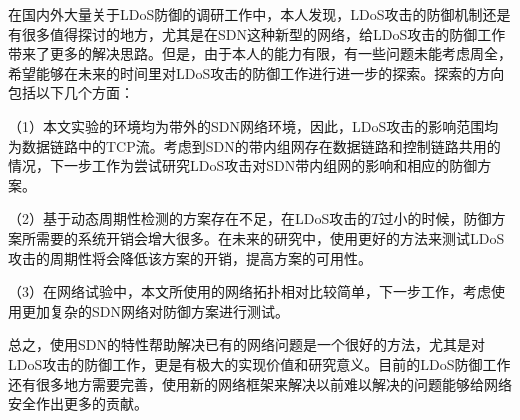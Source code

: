 在国内外大量关于LDoS防御的调研工作中，本人发现，LDoS攻击的防御机制还是有很多值得探讨的地方，尤其是在SDN这种新型的网络，给LDoS攻击的防御工作带来了更多的解决思路。但是，由于本人的能力有限，有一些问题未能考虑周全，希望能够在未来的时间里对LDoS攻击的防御工作进行进一步的探索。探索的方向包括以下几个方面：

（1）本文实验的环境均为带外的SDN网络环境，因此，LDoS攻击的影响范围均为数据链路中的TCP流。考虑到SDN的带内组网存在数据链路和控制链路共用的情况，下一步工作为尝试研究LDoS攻击对SDN带内组网的影响和相应的防御方案。

（2）基于动态周期性检测的方案存在不足，在LDoS攻击的$T$过小的时候，防御方案所需要的系统开销会增大很多。在未来的研究中，使用更好的方法来测试LDoS攻击的周期性将会降低该方案的开销，提高方案的可用性。

（3）在网络试验中，本文所使用的网络拓扑相对比较简单，下一步工作，考虑使用更加复杂的SDN网络对防御方案进行测试。

总之，使用SDN的特性帮助解决已有的网络问题是一个很好的方法，尤其是对LDoS攻击的防御工作，更是有极大的实现价值和研究意义。目前的LDoS防御工作还有很多地方需要完善，使用新的网络框架来解决以前难以解决的问题能够给网络安全作出更多的贡献。